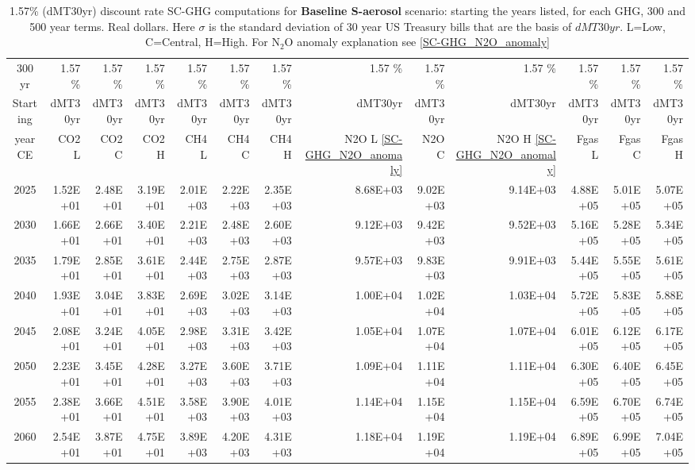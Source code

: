 \documentclass{article}
\begin{document}
\begin{table}
     \caption{1.57\% (dMT30yr) discount rate  SC-GHG computations for \textbf{Baseline S-aerosol} scenario: starting the years listed, for each GHG, 300 and 500 year terms. Real dollars. Here $\sigma$ is the standard deviation of 30 year US Treasury bills that are the basis of $dMT30yr$. L=Low, C=Central, H=High. For N$_2$O anomaly explanation see \ref{SC-GHG_N2O_anomaly}} 
\label{PVs_300_yearSCC_BH1.57}
\small
\begin{tabular}{crrr|rrr|rrr|rrr}
300 yr   & 1.57 \%  & 1.57 \%  & 1.57 \%  & 1.57 \%  & 1.57 \%  & 1.57 \%  & 1.57 \%  & 1.57 \%  & 1.57 \%  & 1.57 \%  & 1.57 \%  & 1.57 \%  \\
Starting & dMT30yr  & dMT30yr  & dMT30yr  & dMT30yr  & dMT30yr  & dMT30yr  & dMT30yr  & dMT30yr  & dMT30yr  & dMT30yr  & dMT30yr  & dMT30yr  \\
year CE  & CO2 L    & CO2 C    & CO2 H    & CH4 L    & CH4 C    & CH4 H    & N2O L \ref{SC-GHG_N2O_anomaly}     & N2O C      & N2O H \ref{SC-GHG_N2O_anomaly}    & Fgas L   & Fgas C   & Fgas H   \\
2025     & 1.52E+01 & 2.48E+01 & 3.19E+01 & 2.01E+03 & 2.22E+03 & 2.35E+03 & 8.68E+03 & 9.02E+03 & 9.14E+03 & 4.88E+05 & 5.01E+05 & 5.07E+05 \\
2030     & 1.66E+01 & 2.66E+01 & 3.40E+01 & 2.21E+03 & 2.48E+03 & 2.60E+03 & 9.12E+03 & 9.42E+03 & 9.52E+03 & 5.16E+05 & 5.28E+05 & 5.34E+05 \\
2035     & 1.79E+01 & 2.85E+01 & 3.61E+01 & 2.44E+03 & 2.75E+03 & 2.87E+03 & 9.57E+03 & 9.83E+03 & 9.91E+03 & 5.44E+05 & 5.55E+05 & 5.61E+05 \\
2040     & 1.93E+01 & 3.04E+01 & 3.83E+01 & 2.69E+03 & 3.02E+03 & 3.14E+03 & 1.00E+04 & 1.02E+04 & 1.03E+04 & 5.72E+05 & 5.83E+05 & 5.88E+05 \\
2045     & 2.08E+01 & 3.24E+01 & 4.05E+01 & 2.98E+03 & 3.31E+03 & 3.42E+03 & 1.05E+04 & 1.07E+04 & 1.07E+04 & 6.01E+05 & 6.12E+05 & 6.17E+05 \\
2050     & 2.23E+01 & 3.45E+01 & 4.28E+01 & 3.27E+03 & 3.60E+03 & 3.71E+03 & 1.09E+04 & 1.11E+04 & 1.11E+04 & 6.30E+05 & 6.40E+05 & 6.45E+05 \\
2055     & 2.38E+01 & 3.66E+01 & 4.51E+01 & 3.58E+03 & 3.90E+03 & 4.01E+03 & 1.14E+04 & 1.15E+04 & 1.15E+04 & 6.59E+05 & 6.70E+05 & 6.74E+05 \\
2060     & 2.54E+01 & 3.87E+01 & 4.75E+01 & 3.89E+03 & 4.20E+03 & 4.31E+03 & 1.18E+04 & 1.19E+04 & 1.19E+04 & 6.89E+05 & 6.99E+05 & 7.04E+05 \\

\end{tabular}
\end{table}
\end{document}
